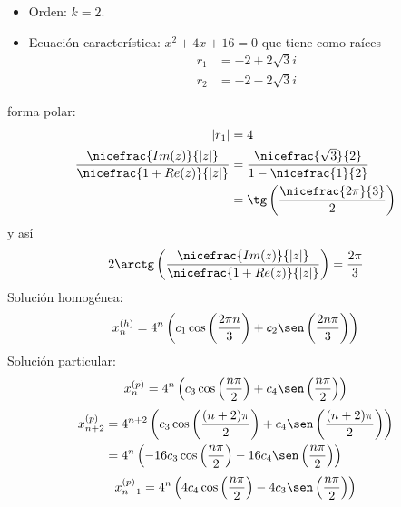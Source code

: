 \begin{ejercicio}


    \begin{itemize}
        \item Orden: $k = 2$.
        \item Ecuación característica: $x^2 + 4x + 16 = 0$ 
            que tiene como raíces
            \begin{align*}
                r_1 &= -2 + 2\sqrt{3}i \\
                r_2 &= -2 -2\sqrt{3}i 
            \end{align*}
    \end{itemize}
    forma polar:
    \begin{align*}
        |r_1| &= 4 \\
        \dfrac{\nicefrac{Im(z)}{|z|}}{\nicefrac{1 + Re(z)}{|z|}} &= \dfrac{\nicefrac{\sqrt{3}}{2}}{1-\nicefrac{1}{2}} \\
                                                                  &= \tg \left(\dfrac{\nicefrac{2\pi}{3}}{2} \right) 
    \end{align*}
    y así 
    \begin{equation*}
        2 \arctg \left(\dfrac{\nicefrac{Im(z)}{|z|}}{\nicefrac{1 + Re(z)}{|z|}}  \right) = \dfrac{2\pi}{3} 
    \end{equation*}
    Solución homogénea:
    \begin{equation*}
        x_n^{(h)} = 4^n \left(c_1 \cos \left(\dfrac{2\pi n}{3}\right) + c_2 \sen \left(\dfrac{2n\pi}{3} \right)  \right) 
    \end{equation*}
    Solución particular:
    \begin{equation*}
        x_n^{(p)} = 4^n \left( c_3 \cos \left(\dfrac{n\pi}{2} \right) + c_4 \sen \left(\dfrac{n\pi}{2} \right)  \right)
    \end{equation*}
    \begin{align*}
        x_{n+2}^{(p)} &= 4^{n+2} \left(c_3 \cos \left(\dfrac{(n+2)\pi}{2}\right) +c_4 \sen \left(\dfrac{(n+2)\pi}{2} \right) \right) \\
                      &= 4^n \left(-16c_3 \cos \left(\dfrac{n\pi}{2} \right)  -16 c_4 \sen \left(\dfrac{n\pi}{2} \right) \right) 
    \end{align*} 
    \begin{equation*}
        x_{n+1}^{(p)} = 4^n \left(4c_4 \cos \left(\dfrac{n\pi}{2} \right) -4 c_3 \sen \left(\dfrac{n\pi}{2} \right) \right) 
    \end{equation*}
\end{ejercicio}

